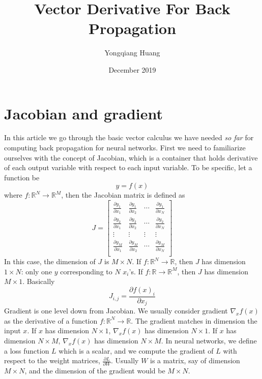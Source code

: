 \documentclass{article}
\title{Vector Derivative For Back Propagation}
\author{Yongqiang Huang}
\date{December 2019}
\begin{document}
\maketitle

\section{Jacobian and gradient}
In this article we go through the basic vector calculus we have needed \emph{so far} for computing back propagation for neural networks. First we need to familiarize ourselves with the concept of Jacobian, which is a container that holds derivative of each output variable with respect to each input variable. To be specific, let a function be
\begin{equation}
    y = f(x)
\end{equation}
where $f: \mathbb{R}^N \rightarrow \mathbb{R}^M$, then the Jacobian matrix is defined as 
\begin{equation}
    J = \begin{bmatrix}
    \frac{\partial y_1}{\partial x_1}& \frac{\partial y_1}{\partial x_2}& \cdots & \frac{\partial y_1}{\partial x_N} \\
    \frac{\partial y_2}{\partial x_1}& \frac{\partial y_2}{\partial x_2}& \cdots & \frac{\partial y_2}{\partial x_N} \\
    \vdots & \vdots & \vdots & \vdots \\
    \frac{\partial y_M}{\partial x_1}& \frac{\partial y_M}{\partial x_2}& \cdots & \frac{\partial y_M}{\partial x_N} \\
    \end{bmatrix}
\end{equation}
In this case, the dimension of $J$ is $M\times N$. If $f: \mathbb{R}^N \rightarrow \mathbb{R}$, then $J$ has dimension $1\times N$: only one $y$ corresponding to $N$ $x_i$'s. If $f: \mathbb{R} \rightarrow \mathbb{R}^M$, then $J$ has dimension $M\times 1$. Basically
\begin{equation}
    J_{i, j} = \frac{\partial f(x)_i}{\partial x_j}
\end{equation}
Gradient is one level down from Jacobian. We usually consider gradient $\nabla_{x}f(x)$ as the derivative of a function $f: \mathbb{R}^N \rightarrow \mathbb{R}$. The gradient matches in dimension the input $x$. If $x$ has dimension $N\times 1$, $\nabla_{x}f(x)$ has dimension $N\times 1$. If $x$ has dimension $N\times M$, $\nabla_{x}f(x)$ has dimension $N\times M$. 
In neural networks, we define a loss function $L$ which is a scalar, and we compute the gradient of $L$ with respect to the weight matrices, $\frac{\partial L}{\partial W}$. Usually $W$ is a matrix, say of dimension $M\times N$, and the dimension of the gradient would be $M\times N$. 
\end{document}
